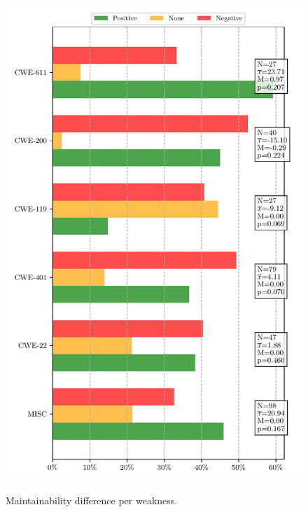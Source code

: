 \documentclass[smallextended]{svjour3}       %
\begin{document}
\begin{figure}[htp]
{	\includegraphics[scale=0.4]{figures/main_per_cwe_spec_664.pdf}}
    \caption{Maintainability difference per weakness.}
	\label{fig:pat}
\end{figure}
\end{document}
